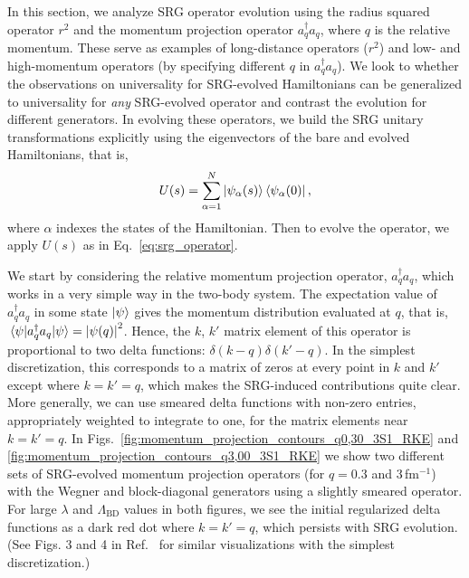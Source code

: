 \documentclass[10pt,aps,prc,floatfix,twocolumn,nofootinbib]{revtex4-1}
\newcommand{\LambdaBD}{{\Lambda_{\text{BD}}}}
\newcommand{\ataq}{a^{\dagger}_q a_q}
\begin{document}
In this section, we analyze SRG operator evolution using the radius squared operator $r^2$ and the momentum projection operator $\ataq$, where $q$ is the relative momentum.
These serve as examples of long-distance operators ($r^2$) and low- and high-momentum operators (by specifying different $q$ in $\ataq$). 
We look to whether the observations on universality for SRG-evolved Hamiltonians can be generalized to universality for \emph{any} SRG-evolved operator and contrast the evolution for different generators.
In evolving these operators, we build the SRG unitary transformations explicitly using the eigenvectors of the bare and evolved Hamiltonians, that is,
%
\begin{eqnarray}
	\label{eq:unitary_transformation}
	U(s) = \sum_{\alpha=1}^{N} \ket{\psi_{\alpha}(s)} \bra{\psi_{\alpha}(0)},
\end{eqnarray}
%
where $\alpha$ indexes the states of the Hamiltonian.
Then to evolve the operator, we apply $U(s)$ as in Eq.~\eqref{eq:srg_operator}.


We start by considering the relative momentum projection operator,
$\ataq$, which works in a very simple way in the two-body system.
The expectation value of $\ataq$ in some state $\ket{\psi}$ gives the momentum distribution evaluated at $q$, that is, $\mel{\psi}{\ataq}{\psi}=\abs{\psi(q)}^2$.
Hence, the $k$, $k'$ matrix element of this operator is proportional to two delta functions: $\delta(k-q) \delta(k'-q)$.
In the simplest discretization, this corresponds to a matrix of zeros at every point in $k$ and $k'$ except where $k=k'=q$, which makes the SRG-induced contributions quite clear.
More generally, we can use smeared delta functions with non-zero entries, appropriately weighted to integrate to one, for the matrix elements near $k=k'=q$. 
In Figs.~\ref{fig:momentum_projection_contours_q0,30_3S1_RKE} and \ref{fig:momentum_projection_contours_q3,00_3S1_RKE} we show two different sets of SRG-evolved momentum projection operators (for $q=0.3$ and $3$\,fm$^{-1}$) with the Wegner and block-diagonal generators using a slightly smeared operator.
For large $\lambda$ and $\LambdaBD$ values in both figures, we see the initial regularized delta functions as a dark red dot where $k=k'=q$, which persists with SRG evolution.
(See Figs. 3 and 4 in Ref.~\cite{Anderson:2010aq} for similar visualizations with the simplest discretization.)
\end{document}
